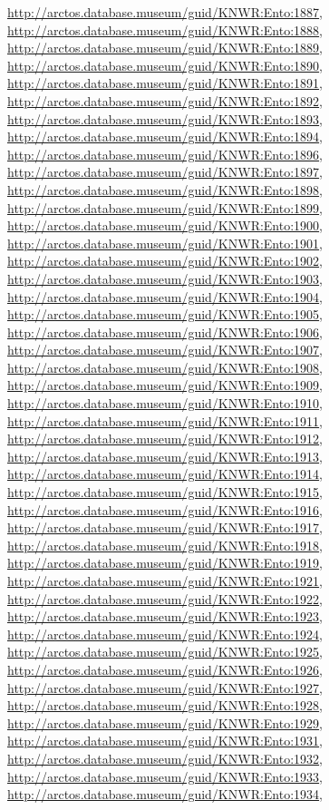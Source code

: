 \documentclass[9pt, article]{memoir}
\begin{document}
\begin{multicols}{2}
\url{http://arctos.database.museum/guid/KNWR:Ento:1887}, 
\url{http://arctos.database.museum/guid/KNWR:Ento:1888}, 
\url{http://arctos.database.museum/guid/KNWR:Ento:1889}, 
\url{http://arctos.database.museum/guid/KNWR:Ento:1890}, 
\url{http://arctos.database.museum/guid/KNWR:Ento:1891}, 
\url{http://arctos.database.museum/guid/KNWR:Ento:1892}, 
\url{http://arctos.database.museum/guid/KNWR:Ento:1893}, 
\url{http://arctos.database.museum/guid/KNWR:Ento:1894}, 
\url{http://arctos.database.museum/guid/KNWR:Ento:1896}, 
\url{http://arctos.database.museum/guid/KNWR:Ento:1897}, 
\url{http://arctos.database.museum/guid/KNWR:Ento:1898}, 
\url{http://arctos.database.museum/guid/KNWR:Ento:1899}, 
\url{http://arctos.database.museum/guid/KNWR:Ento:1900}, 
\url{http://arctos.database.museum/guid/KNWR:Ento:1901}, 
\url{http://arctos.database.museum/guid/KNWR:Ento:1902}, 
\url{http://arctos.database.museum/guid/KNWR:Ento:1903}, 
\url{http://arctos.database.museum/guid/KNWR:Ento:1904}, 
\url{http://arctos.database.museum/guid/KNWR:Ento:1905}, 
\url{http://arctos.database.museum/guid/KNWR:Ento:1906}, 
\url{http://arctos.database.museum/guid/KNWR:Ento:1907}, 
\url{http://arctos.database.museum/guid/KNWR:Ento:1908}, 
\url{http://arctos.database.museum/guid/KNWR:Ento:1909}, 
\url{http://arctos.database.museum/guid/KNWR:Ento:1910}, 
\url{http://arctos.database.museum/guid/KNWR:Ento:1911}, 
\url{http://arctos.database.museum/guid/KNWR:Ento:1912}, 
\url{http://arctos.database.museum/guid/KNWR:Ento:1913}, 
\url{http://arctos.database.museum/guid/KNWR:Ento:1914}, 
\url{http://arctos.database.museum/guid/KNWR:Ento:1915}, 
\url{http://arctos.database.museum/guid/KNWR:Ento:1916}, 
\url{http://arctos.database.museum/guid/KNWR:Ento:1917}, 
\url{http://arctos.database.museum/guid/KNWR:Ento:1918}, 
\url{http://arctos.database.museum/guid/KNWR:Ento:1919}, 
\url{http://arctos.database.museum/guid/KNWR:Ento:1921}, 
\url{http://arctos.database.museum/guid/KNWR:Ento:1922}, 
\url{http://arctos.database.museum/guid/KNWR:Ento:1923}, 
\url{http://arctos.database.museum/guid/KNWR:Ento:1924}, 
\url{http://arctos.database.museum/guid/KNWR:Ento:1925}, 
\url{http://arctos.database.museum/guid/KNWR:Ento:1926}, 
\url{http://arctos.database.museum/guid/KNWR:Ento:1927}, 
\url{http://arctos.database.museum/guid/KNWR:Ento:1928}, 
\url{http://arctos.database.museum/guid/KNWR:Ento:1929}, 
\url{http://arctos.database.museum/guid/KNWR:Ento:1931}, 
\url{http://arctos.database.museum/guid/KNWR:Ento:1932}, 
\url{http://arctos.database.museum/guid/KNWR:Ento:1933}, 
\url{http://arctos.database.museum/guid/KNWR:Ento:1934}, 

\end{multicols}
\end{document}
